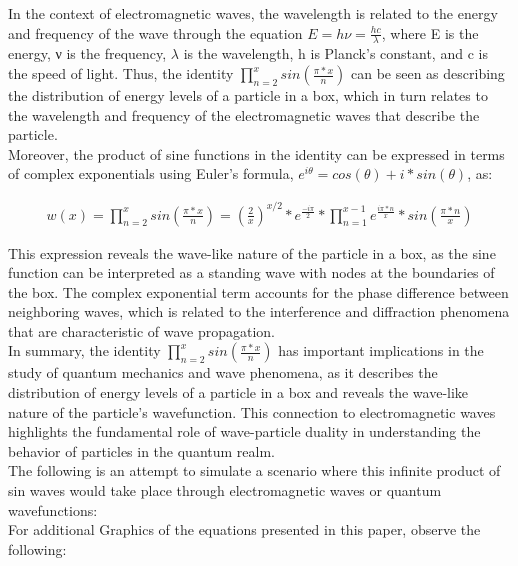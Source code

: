 \documentclass{article}
\begin{document}
In the context of electromagnetic waves, the wavelength is related to the energy and frequency of the wave through the equation $E = hν = \frac{hc}{\lambda}$, where E is the energy, ν is the frequency, $\lambda$ is the wavelength, h is Planck's constant, and c is the speed of light. Thus, the identity $\prod_{n=2}^{x} sin\left(\frac{\pi*x}{n}\right) $ can be seen as describing the distribution of energy levels of a particle in a box, which in turn relates to the wavelength and frequency of the electromagnetic waves that describe the particle. \\

Moreover, the product of sine functions in the identity can be expressed in terms of complex exponentials using Euler's formula, $e^{i\theta} = cos\left(\theta\right) + i*sin\left(\theta\right)$, as:

\begin{align*}
w(x) = \prod_{n=2}^{x} sin\left(\frac{\pi*x}{n}\right) = \left(\frac{2}{x}\right)^{x/2} * e^{\frac{-i\pi}{2}} * \prod_{n=1}^{x-1} e^{\frac{i\pi * n}{x}} * sin\left(\frac{\pi*n}{x}\right)
\end{align*}

This expression reveals the wave-like nature of the particle in a box, as the sine function can be interpreted as a standing wave with nodes at the boundaries of the box. The complex exponential term accounts for the phase difference between neighboring waves, which is related to the interference and diffraction phenomena that are characteristic of wave propagation. \\

In summary, the identity $\prod_{n=2}^{x} sin\left(\frac{\pi*x}{n}\right)$ has important implications in the study of quantum mechanics and wave phenomena, as it describes the distribution of energy levels of a particle in a box and reveals the wave-like nature of the particle's wavefunction. This connection to electromagnetic waves highlights the fundamental role of wave-particle duality in understanding the behavior of particles in the quantum realm. \\

The following is an attempt to simulate a scenario where this infinite product of sin waves would take place through electromagnetic waves or quantum wavefunctions: \\

For additional Graphics of the equations presented in this paper, observe the following: \\
\end{document}
